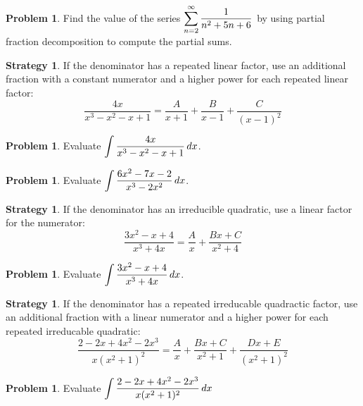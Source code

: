 \documentclass[letterpaper, twoside, 12pt]{book}
\theoremstyle{definition}
\theoremstyle{definition}
\newtheorem{problem}[theorem]{Problem}
\newtheorem{strategy}[theorem]{Strategy}
\newcommand{\ds}{\ensuremath{\displaystyle}}
\begin{document}
\vfill

\begin{problem}
  Find the value of the series
  $\ds \sum_{n=2}^\infty \frac{1}{n^2+5n+6}$
  by using partial fraction decomposition to compute the partial sums.
\end{problem}

\vfill

\newpage

\begin{strategy}
  If the denominator has a repeated linear factor,
  use an additional fraction with a constant numerator and a higher power
  for each repeated linear factor:
  \[
    \frac{4x}{x^3-x^2-x+1}
      =
    \frac{A}{x+1} + \frac{B}{x-1} + \frac{C}{(x-1)^2}
  \]
\end{strategy}

\begin{problem}
 Evaluate $\ds \int \frac{4x}{x^3 - x^2 -x+1} \, dx$.
\end{problem}

\vfill

\begin{problem}
 Evaluate $\ds \int \frac{6x^2-7x-2}{x^3 - 2x^2} \, dx$.
\end{problem}

\vfill

\newpage

\begin{strategy}
  If the denominator has an irreducible quadratic, use a linear factor
  for the numerator:
  \[
    \frac{3x^2-x+4}{x^3 + 4x} = \frac{A}{x} + \frac{Bx+C}{x^2+4}
  \]
\end{strategy}

\begin{problem}
 Evaluate $\ds \int \frac{3x^2-x+4}{x^3 + 4x} \, dx$.
\end{problem}

\vfill

\begin{strategy}
  If the denominator has a repeated irreducable quadractic factor,
  use an additional fraction with a linear numerator and a higher power
  for each repeated irreducable quadratic:
  \[
    \frac{2-2x+4x^2-2x^3}{x(x^2+1)^2}
      =
    \frac{A}{x}+\frac{Bx+C}{x^2+1}+\frac{Dx+E}{(x^2+1)^2}
  \]
\end{strategy}

\begin{problem}
 Evaluate $\ds \int \frac{2-2x+4x^2-2x^3}{x(x^2+1)^2} \, dx$
\end{problem}
\end{document}
